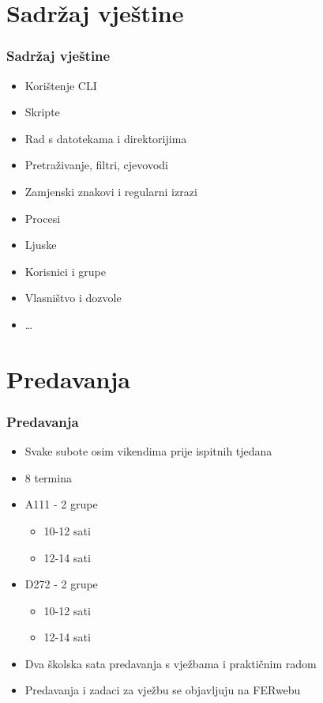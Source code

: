 \documentclass{beamer}
\begin{document}
\section{Sadržaj vještine}
\begin{frame}[t]
	\frametitle{Sadržaj vještine}
	\begin{itemize}
		\item Korištenje CLI
		\item Skripte
		\item Rad s datotekama i direktorijima
		\item Pretraživanje, filtri, cjevovodi
		\item Zamjenski znakovi i regularni izrazi
		\item Procesi
		\item Ljuske
		\item Korisnici i grupe
		\item Vlasništvo i dozvole
		\item \ldots
	\end{itemize}
\end{frame}

\section{Predavanja}
\begin{frame}[t]
\frametitle{Predavanja}
\begin{itemize}
	\item Svake subote osim vikendima prije ispitnih tjedana
	\item 8 termina
	\item A111 - 2 grupe
	\begin{itemize}
		\item 10-12 sati
		\item 12-14 sati
	\end{itemize}
	\item D272 - 2 grupe
	\begin{itemize}
		\item 10-12 sati
		\item 12-14 sati
	\end{itemize}
	\item Dva školska sata predavanja s vježbama i praktičnim radom
	\item Predavanja i zadaci za vježbu se objavljuju na FERwebu
\end{itemize}
\end{frame}
\end{document}
